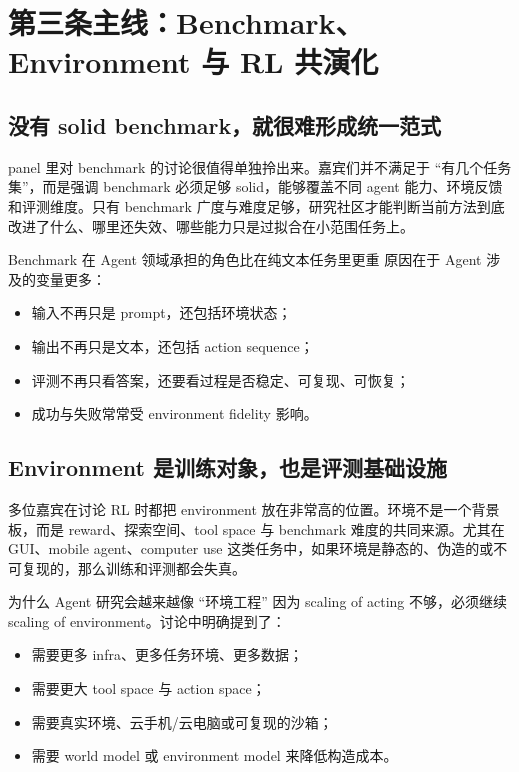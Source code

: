 \section{第三条主线：Benchmark、Environment 与 RL 共演化}

\subsection{没有 solid benchmark，就很难形成统一范式}
panel 里对 benchmark 的讨论很值得单独拎出来。嘉宾们并不满足于 ``有几个任务集''，而是强调 benchmark 必须足够 solid，能够覆盖不同 agent 能力、环境反馈和评测维度。只有 benchmark 广度与难度足够，研究社区才能判断当前方法到底改进了什么、哪里还失效、哪些能力只是过拟合在小范围任务上。

\begin{importantbox}{Benchmark 在 Agent 领域承担的角色比在纯文本任务里更重}
原因在于 Agent 涉及的变量更多：
\begin{itemize}
  \item 输入不再只是 prompt，还包括环境状态；
  \item 输出不再只是文本，还包括 action sequence；
  \item 评测不再只看答案，还要看过程是否稳定、可复现、可恢复；
  \item 成功与失败常常受 environment fidelity 影响。
\end{itemize}
\end{importantbox}

\subsection{Environment 是训练对象，也是评测基础设施}
多位嘉宾在讨论 RL 时都把 environment 放在非常高的位置。环境不是一个背景板，而是 reward、探索空间、tool space 与 benchmark 难度的共同来源。尤其在 GUI、mobile agent、computer use 这类任务中，如果环境是静态的、伪造的或不可复现的，那么训练和评测都会失真。

\begin{knowledgebox}{为什么 Agent 研究会越来越像 ``环境工程''}
因为 scaling of acting 不够，必须继续 scaling of environment。讨论中明确提到了：
\begin{itemize}
  \item 需要更多 infra、更多任务环境、更多数据；
  \item 需要更大 tool space 与 action space；
  \item 需要真实环境、云手机/云电脑或可复现的沙箱；
  \item 需要 world model 或 environment model 来降低构造成本。
\end{itemize}
\end{knowledgebox}

